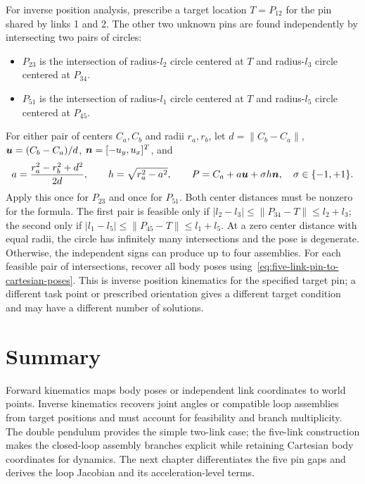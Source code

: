 \documentclass[../main.tex]{subfiles}
\begin{document}
For inverse position analysis, prescribe a target location $T=P_{12}$ for the pin shared by links 1 and 2. The other two unknown pins are found independently by intersecting two pairs of circles:
\begin{itemize}
\item $P_{23}$ is the intersection of radius-$l_2$ circle centered at $T$ and radius-$l_3$ circle centered at $P_{34}$.
\item $P_{51}$ is the intersection of radius-$l_1$ circle centered at $T$ and radius-$l_5$ circle centered at $P_{45}$.
\end{itemize}
For either pair of centers $C_a,C_b$ and radii $r_a,r_b$, let $d=\|C_b-C_a\|$, $\boldsymbol{u}=(C_b-C_a)/d$, $\boldsymbol{n}=[-u_y,u_x]^T$, and
\begin{equation}
a=\frac{r_a^2-r_b^2+d^2}{2d},
\qquad h=\sqrt{r_a^2-a^2},
\qquad P=C_a+a\boldsymbol{u}+\sigma h\boldsymbol{n},\quad \sigma\in\{-1,+1\}.
\label{eq:five-link-inverse-circle-intersection}
\end{equation}
Apply this once for $P_{23}$ and once for $P_{51}$. Both center distances must be nonzero for the formula. The first pair is feasible only if $|l_2-l_3|\le\|P_{34}-T\|\le l_2+l_3$; the second only if $|l_1-l_5|\le\|P_{45}-T\|\le l_1+l_5$. At a zero center distance with equal radii, the circle has infinitely many intersections and the pose is degenerate. Otherwise, the independent signs can produce up to four assemblies. For each feasible pair of intersections, recover all body poses using~\eqref{eq:five-link-pin-to-cartesian-poses}. This is inverse position kinematics for the specified target pin; a different task point or prescribed orientation gives a different target condition and may have a different number of solutions.

\section{Summary}

Forward kinematics maps body poses or independent link coordinates to world points. Inverse kinematics recovers joint angles or compatible loop assemblies from target positions and must account for feasibility and branch multiplicity. The double pendulum provides the simple two-link case; the five-link construction makes the closed-loop assembly branches explicit while retaining Cartesian body coordinates for dynamics. The next chapter differentiates the five pin gaps and derives the loop Jacobian and its acceleration-level terms.

\ifSubfilesClassLoaded{\backmatter\bookbibliography}{}
\end{document}

